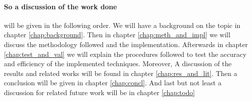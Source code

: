 	\paragraph{    So a discussion of the work done} will be given in the following order. We will have a background on the topic in chapter \ref{chap:background}. Then in chapter \ref{chap:meth_and_impl} we will discuss the methodology followed and the implementation. Afterwards in chapter \ref{chap:test_and_val} we will explain the procedures followed to test the accuracy and efficiency of the implemented techniques. Moreover, A discussion of the results and related works will be found in chapter \ref{chap:res_and_lit}. Then a conclusion will be given in chapter \ref{chap:concl}. And last but not least a discussion for related future work will be in chapter \ref{chap:todo} 
